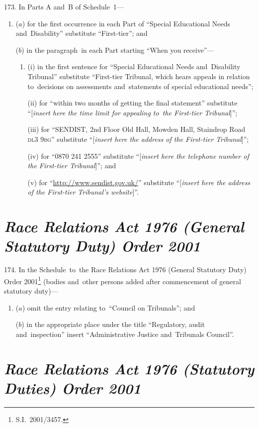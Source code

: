 \documentclass[12pt,a4paper]{article}
\begin{document}
173.  In Parts A and~B of Schedule~1—
\begin{enumerate}\item[]
($a$) for the first occurrence in each Part of “Special Educational Needs and~Disability” substitute “First-tier”; and

($b$) in the paragraph~in each Part starting “When you receive”—
\begin{enumerate}\item[]
(i) in the first sentence for “Special Educational Needs and~Disability Tribunal” substitute “First-tier Tribunal, which hears appeals in relation to~decisions on assessments and~statements of special educational needs”;

(ii) for “within two months of getting the final statement” substitute “[\emph{insert here the time limit for appealing to~the First-tier Tribunal}]”;

(iii) for “SENDIST, 2nd Floor Old Hall, Mowden Hall, Staindrop Road \textsc{\lowercase{DL3 9BG}}” substitute “[\emph{insert here the address of the First-tier Tribunal}]”;

(iv) for “0870 241 2555” substitute “[\emph{insert here the telephone number of the First-tier Tribunal}]”; and

(v) for “\url{http://www.sendist.gov.uk/}” substitute “[\emph{insert here the address of the First-tier Tribunal’s website}]”.
\end{enumerate}
\end{enumerate}

\section*{\itshape Race Relations Act 1976 (General Statutory Duty) Order 2001}

174.  In the Schedule~to~the Race Relations Act 1976 (General Statutory Duty) Order 2001\footnote{S.I.~2001/3457.} (bodies and~other persons added after commencement of general statutory duty)—
\begin{enumerate}\item[]
($a$) omit the entry relating to~“Council on Tribunals”; and

($b$) in the appropriate place under the title “Regulatory, audit and~inspection” insert “Administrative Justice and~Tribunals Council”.
\end{enumerate}

\section*{\itshape Race Relations Act 1976 (Statutory Duties) Order 2001}
\end{document}
